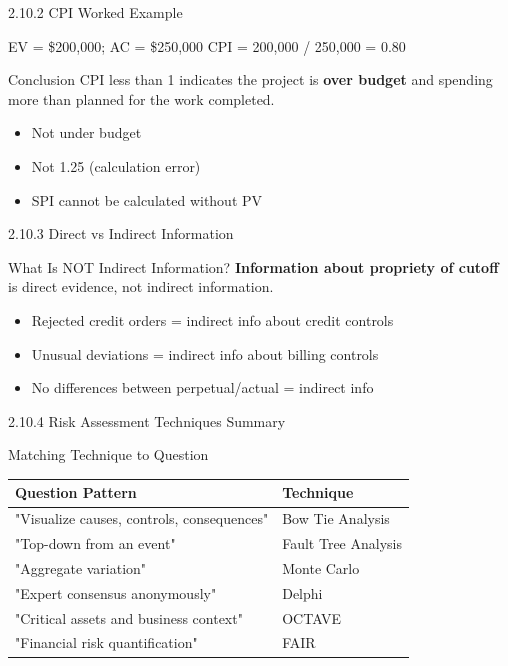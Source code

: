 \documentclass{beamer}
\begin{document}
	\begin{frame}{2.10.2 CPI Worked Example}
		\begin{block}{EV = \$200,000; AC = \$250,000}
			CPI = 200,000 / 250,000 = 0.80
		\end{block}
		\begin{exampleblock}{Conclusion}
			CPI less than 1 indicates the project is \textbf{over budget} and spending more than planned for the work completed.
		\end{exampleblock}
		\begin{itemize}
			\item Not under budget
			\item Not 1.25 (calculation error)
			\item SPI cannot be calculated without PV
		\end{itemize}
	\end{frame}
	
	\begin{frame}{2.10.3 Direct vs Indirect Information}
		\begin{block}{What Is NOT Indirect Information?}
			\textbf{Information about propriety of cutoff} is direct evidence, not indirect information.
		\end{block}
		\begin{itemize}
			\item Rejected credit orders = indirect info about credit controls
			\item Unusual deviations = indirect info about billing controls
			\item No differences between perpetual/actual = indirect info
		\end{itemize}
	\end{frame}
	
	\begin{frame}{2.10.4 Risk Assessment Techniques Summary}
		\begin{block}{Matching Technique to Question}
			\begin{tabular}{|p{5cm}|p{5cm}|}
				\hline
				\textbf{Question Pattern} & \textbf{Technique} \\
				\hline
				"Visualize causes, controls, consequences" & Bow Tie Analysis \\
				\hline
				"Top-down from an event" & Fault Tree Analysis \\
				\hline
				"Aggregate variation" & Monte Carlo \\
				\hline
				"Expert consensus anonymously" & Delphi \\
				\hline
				"Critical assets and business context" & OCTAVE \\
				\hline
				"Financial risk quantification" & FAIR \\
				\hline
			\end{tabular}
		\end{block}
	\end{frame}
	
\end{document}
